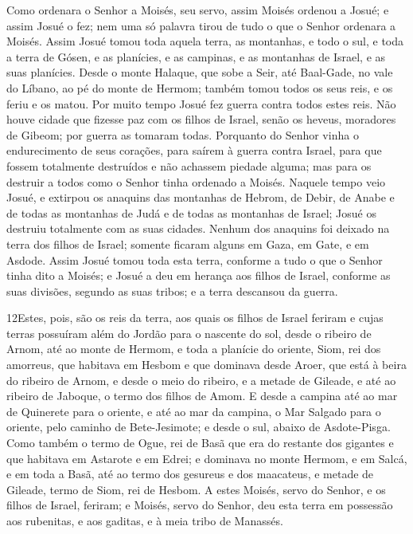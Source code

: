 Como ordenara o Senhor a Moisés, seu servo, assim Moisés ordenou
a Josué; e assim Josué o fez; nem uma só palavra tirou de tudo o que
o Senhor ordenara a Moisés. Assim Josué tomou toda aquela
terra, as montanhas, e todo o sul, e toda a terra de Gósen, e as
planícies, e as campinas, e as montanhas de Israel, e as suas
planícies. Desde o monte Halaque, que sobe a Seir, até
Baal-Gade, no vale do Líbano, ao pé do monte de Hermom; também tomou
todos os seus reis, e os feriu e os matou. Por muito tempo
Josué fez guerra contra todos estes reis. Não houve cidade
que fizesse paz com os filhos de Israel, senão os heveus, moradores
de Gibeom; por guerra as tomaram todas. Porquanto do Senhor
vinha o endurecimento de seus corações, para saírem à guerra contra
Israel, para que fossem totalmente destruídos e não achassem piedade
alguma; mas para os destruir a todos como o Senhor tinha ordenado a
Moisés. Naquele tempo veio Josué, e extirpou os anaquins das
montanhas de Hebrom, de Debir, de Anabe e de todas as montanhas de
Judá e de todas as montanhas de Israel; Josué os destruiu totalmente
com as suas cidades. Nenhum dos anaquins foi deixado na terra
dos filhos de Israel; somente ficaram alguns em Gaza, em Gate, e em
Asdode. Assim Josué tomou toda esta terra, conforme a tudo o
que o Senhor tinha dito a Moisés; e Josué a deu em herança aos
filhos de Israel, conforme as suas divisões, segundo as suas tribos;
e a terra descansou da guerra.

\medskip

\lettrine{12} Estes, pois, são os reis da terra, aos quais os
filhos de Israel feriram e cujas terras possuíram além do Jordão
para o nascente do sol, desde o ribeiro de Arnom, até ao monte de
Hermom, e toda a planície do oriente, Siom, rei dos amorreus,
que habitava em Hesbom e que dominava desde Aroer, que está à beira
do ribeiro de Arnom, e desde o meio do ribeiro, e a metade de
Gileade, e até ao ribeiro de Jaboque, o termo dos filhos de Amom.
E desde a campina até ao mar de Quinerete para o oriente, e até
ao mar da campina, o Mar Salgado para o oriente, pelo caminho de
Bete-Jesimote; e desde o sul, abaixo de Asdote-Pisga. Como
também o termo de Ogue, rei de Basã que era do restante dos gigantes
e que habitava em Astarote e em Edrei; e dominava no monte
Hermom, e em Salcá, e em toda a Basã, até ao termo dos gesureus e
dos maacateus, e metade de Gileade, termo de Siom, rei de Hesbom.
A estes Moisés, servo do Senhor, e os filhos de Israel, feriram;
e Moisés, servo do Senhor, deu esta terra em possessão aos
rubenitas, e aos gaditas, e à meia tribo de Manassés.

